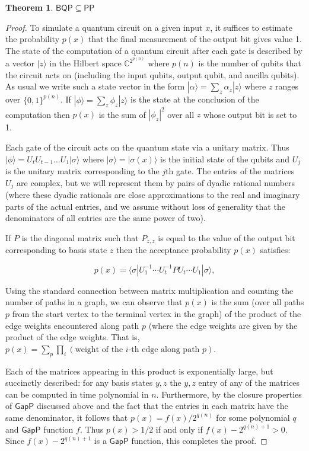 \documentclass[12pt]{report}
\theoremstyle{plain}
\newtheorem{theorem}{Theorem}[section]
\theoremstyle{definition}
\renewcommand{\ket}[1]{|#1\rangle}
\begin{document}
\begin{theorem}
\label{bqppp}
$\mathsf{BQP} \subseteq \mathsf{PP}$
\end{theorem}

\begin{proof}
To simulate a quantum circuit on a given input $x$, it suffices to estimate the probability $p(x)$ that
the final measurement of the output bit gives value 1.
The state of the computation of a quantum circuit after each gate
is described by a vector $\ket{z}$ in the Hilbert space
$\mathbb{C}^{2^{p(n)}}$ where $p(n)$ is the number of qubits that the circuit
acts on (including the input qubits, output qubit, and ancilla qubits).
As usual we write such a state vector in the form $\ket{\alpha} = \sum_{z} \alpha_z|z\rangle$
where $z$ ranges over $\{0,1\}^{p(n)}$.
If $\ket{\phi}=\sum_z \phi_z \ket{z}$ is the state at the conclusion of the computation then
$p(x)$ is the sum of $|\phi_{z}|^2$ over all
$z$ whose output bit is set to 1.

Each gate of the circuit acts on the quantum state via a unitary matrix.
Thus $\ket{\phi} = U_tU_{t-1}\ldots U_1 \ket{\sigma}$ where $\ket{\sigma}=\ket{\sigma(x)}$ is the
initial state of the qubits and $U_j$ is the unitary matrix corresponding to the $j$th gate.  The entries of the matrices $U_j$ are complex, but we will
represent them by pairs of dyadic rational numbers (where these dyadic
rationals are close approximations to the real and imaginary parts of the
actual entries, and we assume without loss of generality that the denominators
of all entries are the same power of two).

If $P$ is the diagonal matrix such that $P_{z,z}$ is equal to the value of the output bit corresponding to basis
state $z$ then the acceptance probability $p(x)$ satisfies:

\[
p(x) = \langle \sigma |U_1^{-1} \cdots U_t^{-1}PU_t \cdots U_1\ket{\sigma},
\]

Using the standard connection between matrix multiplication and counting
the number of paths in a graph, we can observe that $p(x)$ is the sum
(over all paths $p$ from the start vertex to the terminal vertex in the graph)
of the product of the edge weights encountered along path $p$ (where the
edge weights are given by the product of the edge weights.
That is, $p(x) = \sum_p \prod_i (\mbox{weight of the $i$-th edge along path $p$})$.

Each of the matrices appearing in this product is exponentially large, but succinctly described: for any
basis states $y,z$ the $y,z$ entry of any of the matrices can be computed in
time polynomial in $n$.
Furthermore, by the closure properties of $\mathsf{GapP}$ discussed above and
the fact that the entries in each matrix have the same denominator, it follows
that $p(x) = f(x)/2^{q(n)}$ for some polynomial
$q$ and $\mathsf{GapP}$ function $f$.  Thus $p(x) > 1/2$ if and only if
$f(x) - 2^{q(n)+1} > 0$.
Since $f(x) - 2^{q(n)+1}$ is a $\mathsf{GapP}$ function, this completes
the proof.
\end{proof}
\end{document}
